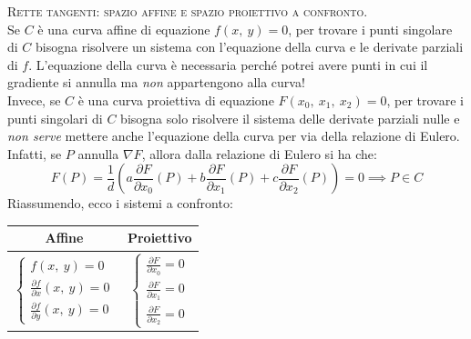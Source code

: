 \begin{observe} \textsc{Rette tangenti: spazio affine e spazio proiettivo a confronto.}\\
	Se $C$ è una curva affine di equazione $f\left(x,\ y\right)=0$, per trovare i punti singolare di $C$ bisogna risolvere un sistema con l'equazione della curva e le derivate parziali di $f$. L'equazione della curva è necessaria perché potrei avere punti in cui il gradiente si annulla ma \textit{non} appartengono alla curva!\\ 
	Invece, se $C$ è una curva proiettiva di equazione $F\left(x_0,\ x_1,\ x_2\right)=0$, per trovare i punti singolari di $C$ bisogna solo risolvere il sistema delle derivate parziali nulle e \textit{non serve} mettere anche l'equazione della curva per via della relazione di Eulero. Infatti, se $P$ annulla $\nabla F$, allora dalla relazione di Eulero si ha che:
		\begin{equation*}
			F\left(P\right)=\frac{1}{d}\left( a\frac{\partial{F}}{\partial{x_0}}\left(P\right) + b\frac{\partial{F}}{\partial{x_1}}\left(P\right) + c\frac{\partial{F}}{\partial{x_2}}\left(P\right) \right) = 0 \implies P\in C
		\end{equation*}
	Riassumendo, ecco i sistemi a confronto:
		\begin{center}
			\begin{tabular}{c|c}
				Affine & Proiettivo \\
				\hline
				$\displaystyle \begin{cases} 
					f\left(x,\ y\right)=0 \\		\frac{\partial{f}}{\partial{x}}\left(x,\ y\right)=0\\	\frac{\partial{f}}{\partial{y}}\left(x,\ y\right)=0
				\end{cases}$ & $\displaystyle \begin{cases}
					\frac{\partial{F}}{\partial{x_0}}=0\\	\frac{\partial{F}}{\partial{x_1}}=0\\	\frac{\partial{F}}{\partial{x_2}}=0 
				\end{cases}$
			\end{tabular}
		\end{center}
\end{observe}


